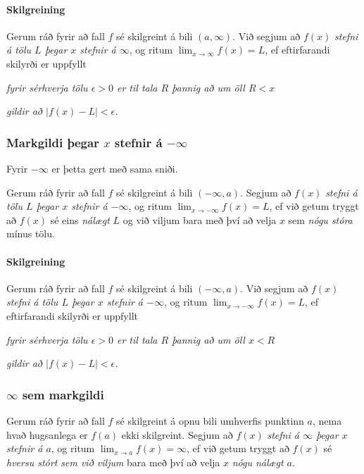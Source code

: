 \documentclass[icelandic,a4paper,12pt]{article}
\begin{document}
\paragraph{Skilgreining}
 Gerum ráð fyrir að fall $f$ sé
skilgreint á bili $(a,\infty)$.  Við segjum að $f(x)$
{\it stefni á tölu $L$ þegar $x$ stefnir á $\infty$}, og ritum
$\lim_{x\rightarrow \infty} f(x)=L$, ef eftirfarandi skilyrði er uppfyllt

{\it fyrir sérhverja tölu $\epsilon>0$ er til tala $R$ þannig
  að um öll $R<x$ } 

{\em gildir að  $|f(x)-L|<\epsilon$.}




\subsubsection*{Markgildi þegar $x$ stefnir á $-\infty$}
Fyrir $-\infty$ er þetta gert með sama sniði.

 Gerum ráð fyrir að fall $f$ sé
skilgreint á bili $(-\infty, a)$.  Segjum að  $f(x)$
{\it stefni á tölu $L$ þegar $x$ stefnir á $-\infty$}, og ritum
$\lim_{x\rightarrow -\infty} f(x)=L$, ef við getum tryggt að  $f(x)$ sé eins
{\em nálægt}
$L$ og við viljum bara með því að velja $x$ sem {\em nógu stóra} 
mínus tölu.
 

 \pause
 
\paragraph{Skilgreining}
Gerum ráð fyrir að fall $f$ sé
skilgreint á bili $(-\infty,a)$.  Við segjum að $f(x)$
{\it stefni á tölu $L$ þegar $x$ stefnir á $-\infty$}, og ritum
$\lim_{x\rightarrow -\infty} f(x)=L$, ef eftirfarandi skilyrði er uppfyllt

{\it fyrir sérhverja tölu $\epsilon>0$ er til tala $R$ þannig
  að um öll $x<R$ } 

{\em gildir að  $|f(x)-L|<\epsilon$.} 




\subsubsection*{$\infty$ sem markgildi}
 Gerum ráð fyrir að fall $f$ sé
skilgreint á opnu bili umhverfis punktinn $a$, nema hvað hugsanlega er
$f(a)$ ekki skilgreint.  Segjum að  $f(x)$
{\it stefni á $\infty$ þegar $x$ stefnir á $a$}, og ritum
$\lim_{x\rightarrow a} f(x)=\infty$, ef við getum tryggt að  $f(x)$ sé {\em
  hversu stórt sem við viljum}
 bara með því að velja $x$ {\em nógu nálægt} $a$.  
\end{document}
